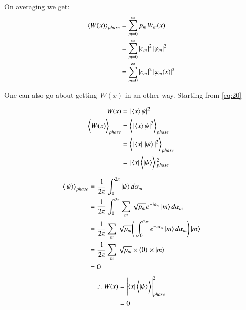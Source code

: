 

On averaging we get:
\begin{align}\label{eq:30}
\left\langle {W}{(x)}\right\rangle _{phase} &=\sum _{m=0}^{ \infty  }{ { p }_{ m }{ W }_{ m } } (x)\\
&=\sum _{ m=0 }^{ \infty  }{ \left| { c }_{ m } \right|^{2} \left| { \varphi  }_{ m } \right|^{2}  }\notag\\
&=\sum _{ m=0 }^{ \infty  }{ \left| { c }_{ m } \right|^{2} \left| { \varphi  }_{ m }(x) \right|^{2}  }\notag
\end{align}

One can also go about getting $W(x)$ in an other way.
Starting from \eqref{eq:20}

\begin{align}\label{wrong:1}
W(x) &= \vert\braket{x}{\psi}\vert^{2}\\
\bigg\langle {{W}(x)}\bigg\rangle_{phase} 
&=\bigg\langle \vert\braket{x}{\psi}\vert^{2}\bigg\rangle_{phase}\notag\\
&=\bigg\langle\vert\bra{x}\thinspace\ket{\psi}\vert^{2}\bigg\rangle_{phase}\notag\\
&=\vert\bra{x}\bigg\langle{\ket{\psi}}\bigg\rangle \vert^{2}_{phase}\notag
\end{align}

\begin{align}\label{eq:31}
\left\langle{\ket{\psi}}\right\rangle_{phase}&=\frac{1}{2\pi}\int_{0}^{2\pi}\ket{\psi}{d{\alpha}_{m}}\notag\\
&=\frac{1}{2\pi}\int_{0}^{2\pi}\sum _{m}\sqrt{{p}_{m}} e^{-i{\alpha}_{m}}\ket{m}{d{\alpha}_{m}}\notag\\
&=\frac{1}{2\pi}\sum _{m}\sqrt{{p}_{m}}\Bigg(\int_{0}^{2\pi} e^{-i{\alpha}_{m}}\ket{m}{d{\alpha}_{m}}\Bigg)\ket{m}\notag\\
&=\frac{1}{2\pi}\sum _{m}\sqrt{{p}_{m}} \times  (0) \times  \ket{m}\notag\\
&=0
\end{align}
\begin{align}\label{eq:32}
\therefore W(x)&=\Biggl|\bra{x}\bigg\langle{\ket{\psi}}\bigg\rangle\Biggr|^{2}_{phase}\notag \\
&= 0 
\end{align}

